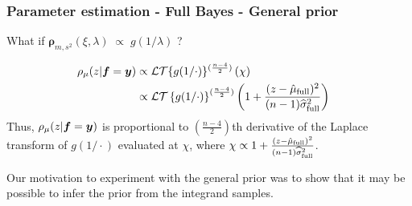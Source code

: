 \documentclass[handout, 10pt,compress,xcolor={usenames,dvipsnames}]{beamer} %
\newcommand{\bm}[1]{\boldsymbol{#1}}
\newcommand{\vrho}{\bm{\rho}}
\begin{document}
\begin{frame}
	\frametitle{Parameter estimation - Full Bayes - General prior}
	\vspace*{-6ex}
	What if $\vrho_{m,s^2}(\xi, \lambda) \; \propto \; g( 1/\lambda )$ ?
	
	\begin{align*}
	{\rho_{\mu}(z | \vf = \vy)} & \propto \mathcal{LT} \{ g(1/\cdot) \}^{(\frac{n-4}2)} \left(\chi \right) \\
	& \propto
	\mathcal{LT} \left\{ g({1}/{\cdot})
	\right\}^{(\frac{n-4}2)} \left( 1 +  \frac{(z - \hmu_{\textup{full}})^2}{(n-1)\widehat{\sigma}_{\textup{full}}^2}\right) \quad %
	\end{align*}
	Thus, $\rho_{\mu}(z | \boldsymbol{f} = \boldsymbol{y})$  is proportional to $\left(\frac{n-4}{2}\right)$th derivative of the Laplace transform of $g(1/\cdot)$ evaluated at $\chi$, where $\chi \propto { 1 +  \frac{(z - \hat{\mu}_{\textup{full}})^2}{(n-1)\widehat{\sigma}_{\textup{full}}^2} } $.
	
	Our motivation to experiment with the general prior was to show that it may
	be possible to infer the prior from the integrand samples.
\end{frame}





















\end{document}
